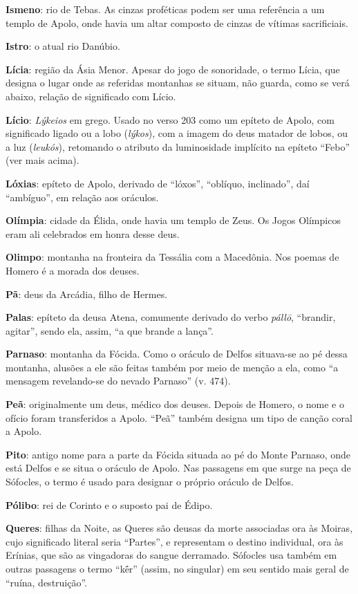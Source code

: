 \textbf{Ismeno}: rio de Tebas. As cinzas proféticas podem ser uma
referência a um templo de Apolo, onde havia um altar composto de cinzas
de vítimas sacrificiais.

\textbf{Istro}: o atual rio Danúbio.

\textbf{Lícia}: região da Ásia Menor. Apesar do jogo de sonoridade,
o termo Lícia, que designa o lugar onde as referidas montanhas se
situam, não guarda, como se verá abaixo, relação de significado com
Lício.

\textbf{Lício}: \emph{Lýkeios} em grego. Usado no verso 203 como um
epíteto de Apolo, com significado ligado ou a lobo (\emph{lýkos}), com a
imagem do deus matador de lobos, ou a luz (\emph{leukós}), retomando o
atributo da luminosidade implícito na epíteto ``Febo'' (ver mais acima).

\textbf{Lóxias}: epíteto de Apolo, derivado de ``lóxos'', ``oblíquo,
inclinado'', daí ``ambíguo'', em relação aos oráculos.

\textbf{Olímpia}: cidade da Élida, onde havia um templo de Zeus. Os
Jogos Olímpicos eram ali celebrados em honra desse deus.

\textbf{Olimpo}: montanha na fronteira da Tessália com a Macedônia.
Nos poemas de Homero é a morada dos deuses.

\textbf{Pã}: deus da Arcádia, filho de Hermes.

\textbf{Palas}: epíteto da deusa Atena, comumente derivado do verbo
\emph{pállō}, ``brandir, agitar'', sendo ela, assim, ``a que brande a
lança''.

\textbf{Parnaso}: montanha da Fócida. Como o oráculo de Delfos
situava-se ao pé dessa montanha, alusões a ele são feitas também por
meio de menção a ela, como ``a mensagem revelando-se do nevado Parnaso''
(v. 474).

\textbf{Peã}: originalmente um deus, médico dos deuses. Depois de
Homero, o nome e o ofício foram transferidos a Apolo. ``Peã'' também
designa um tipo de canção coral a Apolo.

\textbf{Pito}: antigo nome para a parte da Fócida situada ao pé do
Monte Parnaso, onde está Delfos e se situa o oráculo de Apolo. Nas
passagens em que surge na peça de Sófocles, o termo é usado para
designar o próprio oráculo de Delfos.

\textbf{Pólibo}: rei de Corinto e o suposto pai de Édipo.

\textbf{Queres}: filhas da Noite, as Queres são deusas da morte
associadas ora às Moiras, cujo significado literal seria ``Partes'', e
representam o destino individual, ora às Erínias, que são as vingadoras
do sangue derramado. Sófocles usa também em outras passagens o termo
``kḗr'' (assim, no singular) em seu sentido mais geral de ``ruína,
destruição''.


